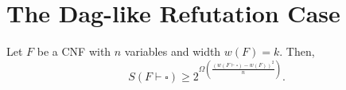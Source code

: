 % 
% 
% 
%  
% 
% 
%  
% 
% 
% 


\section{The Dag-like Refutation Case}


\begin{tcolorbox}[colframe=white, colback=blue!4, boxrule=0mm, sharp corners]
\begin{theorem}
Let $F$ be a CNF with $n$ variables and width $w(F) = k$.
Then,  
$$
S(F \vdash \square) \geq 
    2^{
        \Omega
            \left(
                \frac{
                    \left(
                        w(F \vdash \square) - w(F)
                    \right)^2
                    }
                    {n}
            \right)}.
$$
\end{theorem}
\end{tcolorbox}
 

